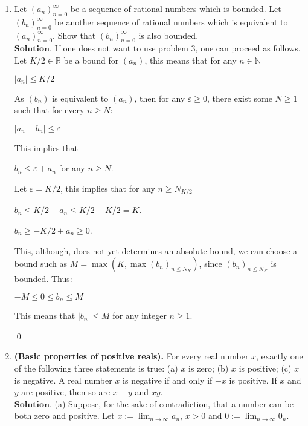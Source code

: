 \documentclass{article}
\theoremstyle{remark}
\begin{document}
\begin{enumerate}
        \item Let \( (a_n)_{n=0}^{\infty} \) be a sequence of rational numbers which is bounded. 
        Let \( (b_n)_{n=0}^{\infty} \) be another sequence of rational numbers which is equivalent to \( (a_n)_{n=0}^{\infty} \). 
        Show that \( (b_n)_{n=0}^{\infty} \) is also bounded.\\
        $\textbf{Solution.}$
        If one does not want to use problem 3, one can proceed as follows.
        Let $K/2 \in \mathbb{R}$ be a bound for $(a_n)$, this means that for any $n\in \mathbb{N}$
        \begin{center}
            $\vert a_n\vert \leq K/2$
        \end{center}
        As $(b_n)$ is equivalent to $(a_n)$, then for any $\varepsilon \geq 0$, there exist some $N\geq 1$ such that
        for every $n \geq N$:
        \begin{center}
            $\vert a_n - b_n \vert \leq \varepsilon$
        \end{center}
        This implies that 
        \begin{center}
            $b_n \leq \varepsilon + a_n$ for any $n \geq N$.
        \end{center}
        Let $\varepsilon = K/2$, this implies that for any $n \geq N_{K/2}$
        \begin{center}
            $b_n \leq K/2 + a_n \leq K/2 + K/2 = K$.
        \end{center}
        \begin{center}
            $b_n \geq -K/2 + a_n \geq 0$.
        \end{center}
        This, although, does not yet determines an absolute bound, we can choose a bound such as
        $M = \max(K, \max(b_n)_{n\leq N_K})$, since $(b_n)_{n\leq N_K}$ is bounded.
        Thus:
        \begin{center}
            $-M \leq 0 \leq b_n \leq M$
        \end{center}
        This means that $\vert b_n \vert \leq M$ for any integer $n \geq 1$.
        \begin{flushleft}
            \qed
        \end{flushleft}
        
        \item \textbf{(Basic properties of positive reals).} For every real number \( x \), exactly one of the following three statements is true: (a) \( x \) is zero; (b) \( x \) is positive; (c) \( x \) is negative. 
        A real number \( x \) is negative if and only if \( -x \) is positive. If \( x \) and \( y \) are positive, then so are \( x + y \) and \( xy \).\\
        $\textbf{Solution.}$
        (a) Suppose, for the sake of contradiction, that a number can be both zero and positive.
        Let $x := \lim_{n\to \infty}a_n$, $x > 0$ and $0 := \lim_{n\to\infty}0_n$. 
        

\end{enumerate}
\end{document}
